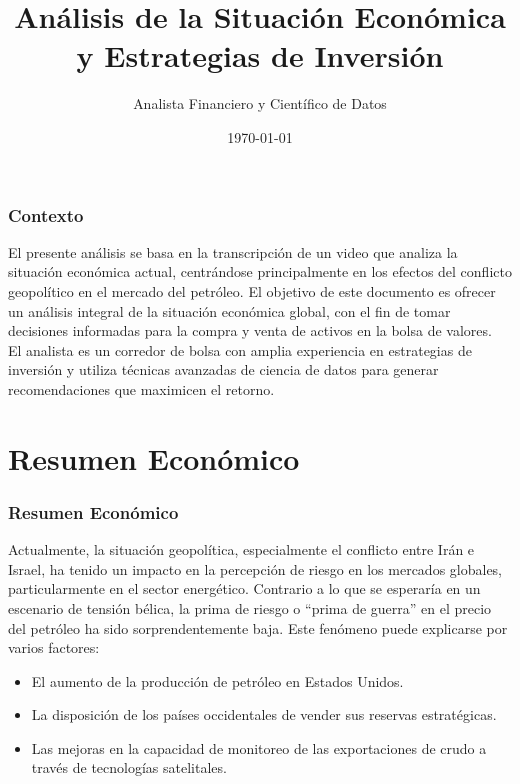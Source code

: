 \documentclass{beamer}
\title{Análisis de la Situación Económica y Estrategias de Inversión}
\author{Analista Financiero y Científico de Datos}
\date{\today}
\begin{document}
\frame{\titlepage}

\begin{frame}
\frametitle{Contexto}
El presente análisis se basa en la transcripción de un video que analiza la situación económica actual, centrándose principalmente en los efectos del conflicto geopolítico en el mercado del petróleo. El objetivo de este documento es ofrecer un análisis integral de la situación económica global, con el fin de tomar decisiones informadas para la compra y venta de activos en la bolsa de valores.\\
El analista es un corredor de bolsa con amplia experiencia en estrategias de inversión y utiliza técnicas avanzadas de ciencia de datos para generar recomendaciones que maximicen el retorno.

\end{frame}

\section{Resumen Económico}
\begin{frame}
\frametitle{Resumen Económico}

Actualmente, la situación geopolítica, especialmente el conflicto entre Irán e Israel, ha tenido un impacto en la percepción de riesgo en los mercados globales, particularmente en el sector energético. Contrario a lo que se esperaría en un escenario de tensión bélica, la prima de riesgo o “prima de guerra” en el precio del petróleo ha sido sorprendentemente baja. Este fenómeno puede explicarse por varios factores:
\begin{itemize}
    \item El aumento de la producción de petróleo en Estados Unidos.
    \item La disposición de los países occidentales de vender sus reservas estratégicas.
    \item Las mejoras en la capacidad de monitoreo de las exportaciones de crudo a través de tecnologías satelitales.
\end{itemize}
\end{frame}
\end{document}

